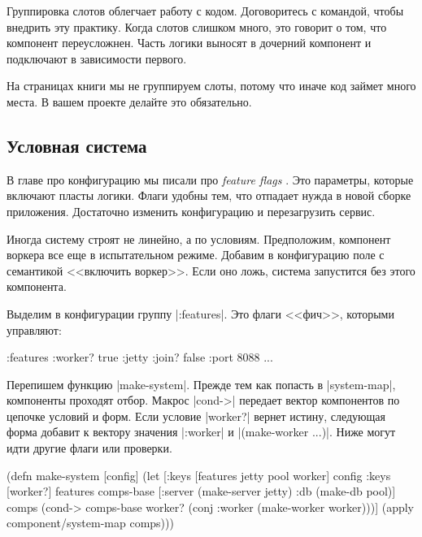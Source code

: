 Группировка слотов облегчает работу с кодом. Договоритесь с командой, чтобы
внедрить эту практику. Когда слотов слишком много, это говорит о том, что
компонент переусложнен. Часть логики выносят в дочерний компонент и подключают в
зависимости первого.

На страницах книги мы не группируем слоты, потому что иначе код займет много
места. В вашем проекте делайте это обязательно.

\subsection{Условная система}

В главе про конфигурацию мы писали про \emph{feature
  flags} . Это параметры, которые включают пласты
логики. Флаги удобны тем, что отпадает нужда в новой сборке
приложения. Достаточно изменить конфигурацию и перезагрузить сервис.

Иногда систему строят не линейно, а по условиям. Предположим, компонент воркера
все еще в испытательном режиме. Добавим в конфигурацию поле с семантикой
<<включить воркер>>. Если оно ложь, система запустится без этого компонента.

Выделим в конфигурации группу \spverb|:features|. Это флаги <<фич>>, которыми
управляют:

\begin{english}
  \begin{clojure}
{:features {:worker? true}
 :jetty {:join? false :port 8088}
 ...}
  \end{clojure}
\end{english}

Перепишем функцию \spverb|make-system|. Прежде тем как попасть в
\spverb|system-map|, компоненты проходят отбор. Макрос \spverb|cond->| передает
вектор компонентов по цепочке условий и форм. Если условие \spverb|worker?|
вернет истину, следующая форма добавит к вектору значения \spverb|:worker| и
\spverb|(make-worker {...})|. Ниже могут идти другие флаги или проверки.

\begin{english}
  \begin{clojure}
(defn make-system [config]
  (let [{:keys [features jetty pool worker]} config
        {:keys [worker?]} features
        comps-base [:server (make-server jetty)
                    :db (make-db pool)]
        comps (cond-> comps-base
                worker?
                (conj :worker (make-worker worker)))]
    (apply component/system-map comps)))
  \end{clojure}
\end{english}

